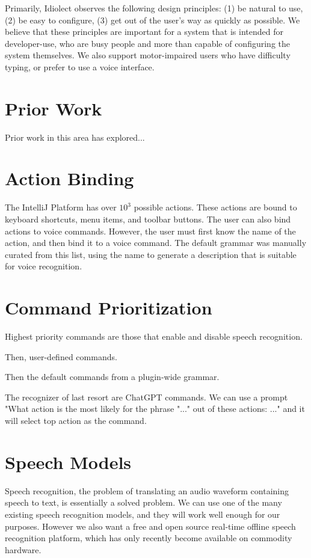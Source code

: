 \documentclass[conference]{IEEEtran}
\begin{document}
Primarily, Idiolect observes the following design principles: (1) be natural to use, (2) be easy to configure, (3) get out of the user's way as quickly as possible. We believe that these principles are important for a system that is intended for developer-use, who are busy people and more than capable of configuring the system themselves. We also support motor-impaired users who have difficulty typing, or prefer to use a voice interface.

\section{Prior Work}

Prior work in this area has explored...

\section{Action Binding}

The IntelliJ Platform has over $10^3$ possible actions. These actions are bound to keyboard shortcuts, menu items, and toolbar buttons. The user can also bind actions to voice commands. However, the user must first know the name of the action, and then bind it to a voice command. The default grammar was manually curated from this list, using the name to generate a description that is suitable for voice recognition.

\section{Command Prioritization}

Highest priority commands are those that enable and disable speech recognition.

Then, user-defined commands.

Then the default commands from a plugin-wide grammar.

The recognizer of last resort are ChatGPT commands. We can use a prompt "What action is the most likely for the phrase "..." out of these actions: ..." and it will select top action as the command.

\section{Speech Models}

Speech recognition, the problem of translating an audio waveform containing speech to text, is essentially a solved problem. We can use one of the many existing speech recognition models, and they will work well enough for our purposes. However we also want a free and open source real-time offline speech recognition platform, which has only recently become available on commodity hardware.
\end{document}
